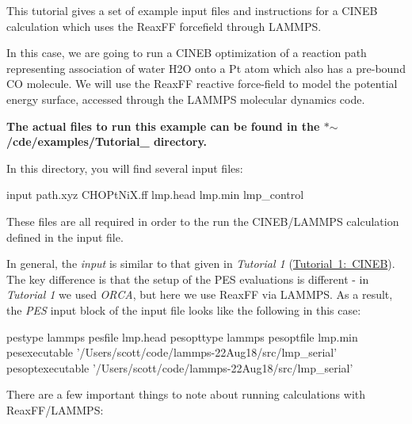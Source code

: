 This tutorial gives a set of example input files and instructions for a C\+I\+N\+EB calculation which uses the Reax\+FF forcefield through L\+A\+M\+M\+PS.

In this case, we are going to run a C\+I\+N\+EB optimization of a reaction path representing association of water H2O onto a Pt atom which also has a pre-\/bound CO molecule. We will use the Reax\+FF reactive force-\/field to model the potential energy surface, accessed through the L\+A\+M\+M\+PS molecular dynamics code.

{\bfseries The actual files to run this example can be found in the $\ast$$\sim$/cde/examples/\+Tutorial\+\_ directory.}

In this directory, you will find several input files\+: \begin{DoxyVerb}  input
  path.xyz
  CHOPtNiX.ff
  lmp.head
  lmp.min
  lmp_control
\end{DoxyVerb}


These files are all required in order to the run the C\+I\+N\+E\+B/\+L\+A\+M\+M\+PS calculation defined in the input file.

In general, the {\itshape input} is similar to that given in {\itshape Tutorial 1} (\mbox{\hyperlink{_tutorial1}{Tutorial 1\+: C\+I\+N\+EB}}). The key difference is that the setup of the P\+ES evaluations is different -\/ in {\itshape Tutorial 1} we used {\itshape O\+R\+CA}, but here we use Reax\+FF via L\+A\+M\+M\+PS. As a result, the {\itshape P\+ES} input block of the input file looks like the following in this case\+: \begin{DoxyVerb}pestype  lammps
pesfile   lmp.head
pesopttype  lammps
pesoptfile lmp.min
pesexecutable '/Users/scott/code/lammps-22Aug18/src/lmp_serial'
pesoptexecutable '/Users/scott/code/lammps-22Aug18/src/lmp_serial'
\end{DoxyVerb}


There are a few important things to note about running calculations with Reax\+F\+F/\+L\+A\+M\+M\+PS\+:


